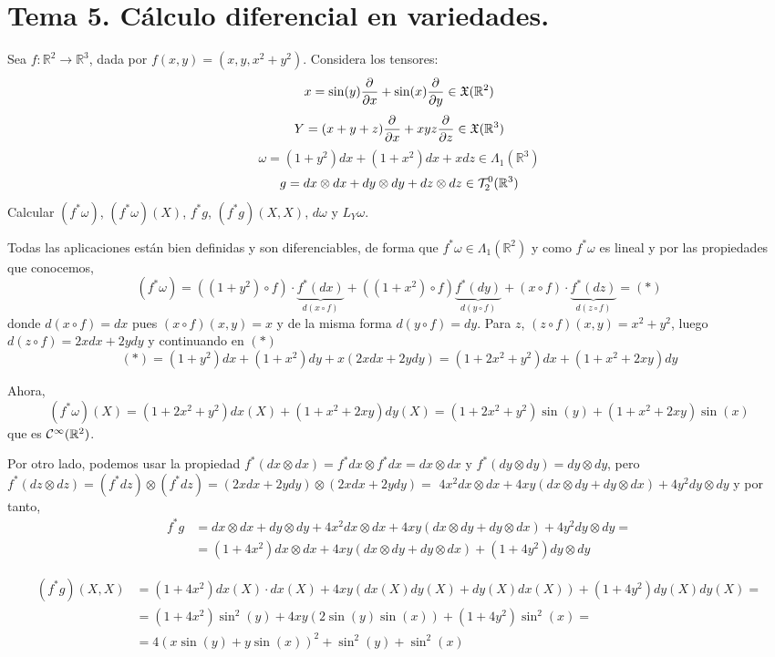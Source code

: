  \section{Tema 5. C\'alculo diferencial en variedades.}
 \begin{ejer}
     [5.12] Sea $f: \mathbb R^2\longrightarrow \mathbb R^3$, dada por $f(x,y)=(x,y,x^2+y^2)$. Considera los tensores:
     $$x=\sin(y)\dfrac{\partial^{} }{\partial x} + \sin(x) \dfrac{\partial^{} }{\partial y} \in \mathfrak X(\mathbb R^2)$$
     $$Y = (x+y+z) \dfrac{\partial^{} }{\partial x} + xyz \dfrac{\partial^{} }{\partial z} \in \mathfrak X(\mathbb R^3)$$
     $$\omega = (1+y^2)dx + (1+x^2)dx+xdz \in \Lambda_1(\mathbb R^3)$$
     $$g = dx \otimes dx + dy \otimes dy + dz  \otimes dz \in \mathcal{T}_2^0 (\mathbb R^3)$$
     Calcular $(f^*\omega)$, $(f^*\omega)(X)$, $f^*g$, $(f^*g)(X,X)$, $d\omega$ y $L_Y\omega$.
 \end{ejer}
 \begin{sol}
     Todas las aplicaciones est\'an bien definidas y son diferenciables, de forma que $f^*\omega\in \Lambda_1(\mathbb R^2)$ y como $f^*\omega$ es lineal y por las propiedades que conocemos, 
     $$(f^*\omega) = \left((1+y^2)\circ f \right) \cdot \underbrace{f^*(dx)}_{d(x\circ f)} + \left((1+x^2)\circ f\right) \underbrace{f^*(dy)}_{d(y\circ f)}  + (x\circ f) \cdot \underbrace{f^*(dz)}_{d(z\circ f)}= (*)$$
     donde $d(x\circ f)=dx$ pues $(x\circ f)(x,y)=x$ y de la misma forma $d(y\circ f)=dy$. Para $z$, $(z\circ f)(x,y) = x^2+y^2$, luego $d(z\circ f) = 2xdx+2ydy$ y continuando en $(*)$
     $$(*)=(1+y^2)dx + (1+x^2)dy + x(2xdx+2ydy)=(1+2x^2+y^2)dx + (1+x^2+2xy)dy $$

     Ahora, $$(f^*\omega)(X)=(1+2x^2+y^2)dx(X) + (1+x^2+2xy)dy (X) = \left(1+2x^2+y^2 \right) \sin(y) + \left(1+x^2+2xy\right) \sin(x) $$
     que es $\mathcal{C}^{\infty}(\mathbb R^2)$. 

     Por otro lado, podemos usar la propiedad $f^*(dx\otimes dx)=f^*dx \otimes f^*dx = dx \otimes dx$ y $f^*(dy \otimes dy) = dy \otimes dy$, pero $f^*(dz\otimes dz) = (f^*dz) \otimes (f^*dz) = (2xdx +2y dy )\otimes(2xdx+2ydy) = $ $4x^2dx \otimes dx + 4xy (dx \otimes dy +dy\otimes dx) + 4y^2 dy\otimes dy$
     y por tanto,
     \[\begin{split} f^*g & = dx \otimes dx + dy \otimes dy + 4x^2dx \otimes dx + 4xy (dx \otimes dy +dy\otimes dx) + 4y^2 dy\otimes dy = \\ & = (1+4x^2)dx\otimes dx + 4xy(dx\otimes dy + dy \otimes dx) + (1+4y^2) dy \otimes dy\end{split}\]

     \[\begin{split}
         (f^*g)(X,X) & = (1+4x^2) dx(X) \cdot dx(X) + 4xy(dx(X)dy(X)+dy(X)dx(X)) + (1+4y^2)dy(X)dy(X) = \\ & = (1+4x^2) \sin^2(y)+ 4xy(2\sin(y)\sin(x)) + (1+4y^2)\sin^2(x) = \\ & = 4\left(x\sin(y)+y \sin(x)\right)^2 + \sin^2(y)+\sin^2(x)
     \end{split}\]


\end{sol}
